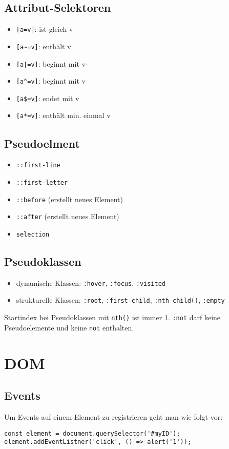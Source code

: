 \documentclass[11pt,twoside,landscape]{article}
\begin{document}
\begin{multicols*}{3}
\subsection{Attribut-Selektoren}
\begin{itemize}
\item \verb+[a=v]+: ist gleich v  
\item \verb+[a~=v]+: enthält v  
\item \verb+[a|=v]+: beginnt mit v-  
\item \verb+[a^=v]+: beginnt mit v
\item \verb+[a$=v]+: endet mit v
\item \verb+[a*=v]+: enthält min. einmal v
\end{itemize}

\subsection{Pseudoelment}
\begin{itemize}
\item \verb+::first-line+  
\item \verb+::first-letter+ 
\item \verb+::before+ (erstellt neues Element)
\item \verb+::after+ (erstellt neues Element)
\item \verb+selection+
\end{itemize}

\subsection{Pseudoklassen}
\begin{itemize}
\item dynamische Klassen: \verb+:hover+, \verb+:focus+, \verb+:visited+
\item strukturelle Klassen: \verb+:root+, \verb+:first-child+, \verb+:nth-child()+, \verb+:empty+
\end{itemize}

Startindex bei Pseudoklassen mit \verb+nth()+ ist immer 1. \verb+:not+ darf keine Pseudoelemente und keine \verb+not+ enthalten.

\section{DOM}
\subsection{Events}
Um Events auf einem Element zu registrieren geht man wie folgt vor:
\begin{verbatim}
const element = document.querySelector('#myID');
element.addEventListner('click', () => alert('1'));
\end{verbatim}


\end{multicols*}
\end{document}
